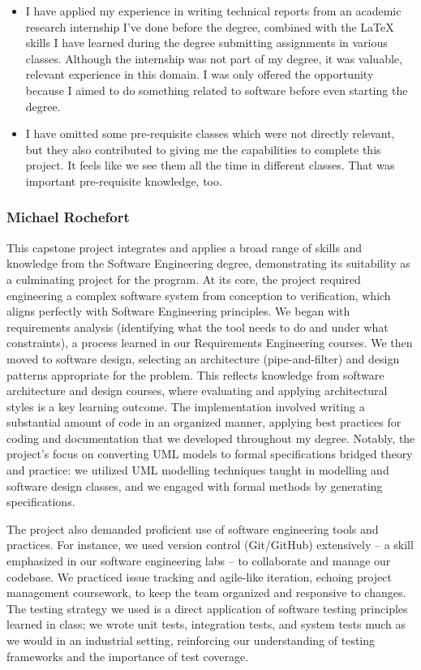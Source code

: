 \begin{itemize}
    \item I have applied my experience in writing technical reports from an academic research internship I've done before the degree,
    combined with the LaTeX skills I have learned during the degree submitting assignments in various classes.
    Although the internship was not part of my degree, it was valuable, relevant experience in this domain.
    I was only offered the opportunity because I aimed to do something related to software before even starting the degree.
    \item I have omitted some pre-requisite classes which were not directly relevant,
    but they also contributed to giving me the capabilities to complete this project.
    It feels like we see them all the time in different classes.
    That was important pre-requisite knowledge, too.
\end{itemize}


\subsubsection{Michael Rochefort}\label{subsubsec:mike-deg}

This capstone project integrates and applies a broad range of skills and knowledge from the Software Engineering degree, demonstrating its suitability as a culminating project for the program. At its core, the project required engineering a complex software system from conception to verification, which aligns perfectly with Software Engineering principles. We began with requirements analysis (identifying what the tool needs to do and under what constraints), a process learned in our Requirements Engineering courses. We then moved to software design, selecting an architecture (pipe-and-filter) and design patterns appropriate for the problem. This reflects knowledge from software architecture and design courses, where evaluating and applying architectural styles is a key learning outcome. The implementation involved writing a substantial amount of code in an organized manner, applying best practices for coding and documentation that we developed throughout my degree. Notably, the project’s focus on converting UML models to formal specifications bridged theory and practice: we utilized UML modelling techniques taught in modelling and software design classes, and we engaged with formal methods by generating specifications.

The project also demanded proficient use of software engineering tools and practices. For instance, we used version control (Git/GitHub) extensively – a skill emphasized in our software engineering labs – to collaborate and manage our codebase. We practiced issue tracking and agile-like iteration, echoing project management coursework, to keep the team organized and responsive to changes. The testing strategy we used is a direct application of software testing principles learned in class; we wrote unit tests, integration tests, and system tests much as we would in an industrial setting, reinforcing our understanding of testing frameworks and the importance of test coverage.

